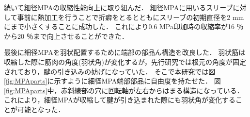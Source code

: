 \documentclass{jarticle}
\begin{document}
続いて細径MPAの収縮性能向上に取り組んだ．
細径MPAに用いるスリーブに対して事前に熱加工を行うことで折癖をとるとともにスリーブの初期直径を2 mmにまで小さくすることに成功した．
これにより0.6 MPa印加時の収縮率が16 ％から20 ％まで向上させることができた．

最後に細径MPAを羽状配置するために端部の部品ん構造を改良した．
羽状筋は収縮した際に筋肉の角度(羽状角)が変化するが，先行研究\cite{crabrobot1}では根元の角度が固定されており，腱の引き込みの妨げになっていた．
そこで本研究では図\ref{fig:MPAparts}に示すように細径MPA端部部品に自由度を持たせた．
図\ref{fig:MPAparts}中，赤斜線部の穴に回転軸が左右からはまる構造になっている．
これにより，細径MPAが収縮して腱が引き込まれた際にも羽状角が変化することが可能となった．
\end{document}
